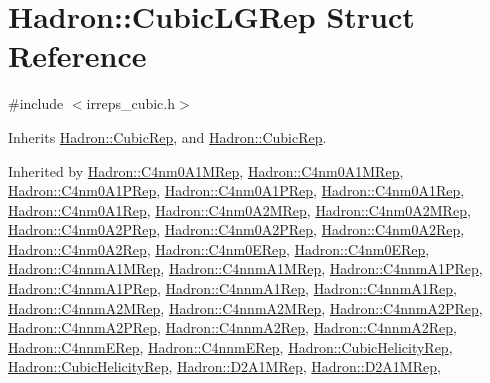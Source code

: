 \hypertarget{structHadron_1_1CubicLGRep}{}\section{Hadron\+:\+:Cubic\+L\+G\+Rep Struct Reference}
\label{structHadron_1_1CubicLGRep}


{\ttfamily \#include $<$irreps\+\_\+cubic.\+h$>$}



Inherits \mbox{\hyperlink{structHadron_1_1CubicRep}{Hadron\+::\+Cubic\+Rep}}, and \mbox{\hyperlink{structHadron_1_1CubicRep}{Hadron\+::\+Cubic\+Rep}}.



Inherited by \mbox{\hyperlink{structHadron_1_1C4nm0A1MRep}{Hadron\+::\+C4nm0\+A1\+M\+Rep}}, \mbox{\hyperlink{structHadron_1_1C4nm0A1MRep}{Hadron\+::\+C4nm0\+A1\+M\+Rep}}, \mbox{\hyperlink{structHadron_1_1C4nm0A1PRep}{Hadron\+::\+C4nm0\+A1\+P\+Rep}}, \mbox{\hyperlink{structHadron_1_1C4nm0A1PRep}{Hadron\+::\+C4nm0\+A1\+P\+Rep}}, \mbox{\hyperlink{structHadron_1_1C4nm0A1Rep}{Hadron\+::\+C4nm0\+A1\+Rep}}, \mbox{\hyperlink{structHadron_1_1C4nm0A1Rep}{Hadron\+::\+C4nm0\+A1\+Rep}}, \mbox{\hyperlink{structHadron_1_1C4nm0A2MRep}{Hadron\+::\+C4nm0\+A2\+M\+Rep}}, \mbox{\hyperlink{structHadron_1_1C4nm0A2MRep}{Hadron\+::\+C4nm0\+A2\+M\+Rep}}, \mbox{\hyperlink{structHadron_1_1C4nm0A2PRep}{Hadron\+::\+C4nm0\+A2\+P\+Rep}}, \mbox{\hyperlink{structHadron_1_1C4nm0A2PRep}{Hadron\+::\+C4nm0\+A2\+P\+Rep}}, \mbox{\hyperlink{structHadron_1_1C4nm0A2Rep}{Hadron\+::\+C4nm0\+A2\+Rep}}, \mbox{\hyperlink{structHadron_1_1C4nm0A2Rep}{Hadron\+::\+C4nm0\+A2\+Rep}}, \mbox{\hyperlink{structHadron_1_1C4nm0ERep}{Hadron\+::\+C4nm0\+E\+Rep}}, \mbox{\hyperlink{structHadron_1_1C4nm0ERep}{Hadron\+::\+C4nm0\+E\+Rep}}, \mbox{\hyperlink{structHadron_1_1C4nnmA1MRep}{Hadron\+::\+C4nnm\+A1\+M\+Rep}}, \mbox{\hyperlink{structHadron_1_1C4nnmA1MRep}{Hadron\+::\+C4nnm\+A1\+M\+Rep}}, \mbox{\hyperlink{structHadron_1_1C4nnmA1PRep}{Hadron\+::\+C4nnm\+A1\+P\+Rep}}, \mbox{\hyperlink{structHadron_1_1C4nnmA1PRep}{Hadron\+::\+C4nnm\+A1\+P\+Rep}}, \mbox{\hyperlink{structHadron_1_1C4nnmA1Rep}{Hadron\+::\+C4nnm\+A1\+Rep}}, \mbox{\hyperlink{structHadron_1_1C4nnmA1Rep}{Hadron\+::\+C4nnm\+A1\+Rep}}, \mbox{\hyperlink{structHadron_1_1C4nnmA2MRep}{Hadron\+::\+C4nnm\+A2\+M\+Rep}}, \mbox{\hyperlink{structHadron_1_1C4nnmA2MRep}{Hadron\+::\+C4nnm\+A2\+M\+Rep}}, \mbox{\hyperlink{structHadron_1_1C4nnmA2PRep}{Hadron\+::\+C4nnm\+A2\+P\+Rep}}, \mbox{\hyperlink{structHadron_1_1C4nnmA2PRep}{Hadron\+::\+C4nnm\+A2\+P\+Rep}}, \mbox{\hyperlink{structHadron_1_1C4nnmA2Rep}{Hadron\+::\+C4nnm\+A2\+Rep}}, \mbox{\hyperlink{structHadron_1_1C4nnmA2Rep}{Hadron\+::\+C4nnm\+A2\+Rep}}, \mbox{\hyperlink{structHadron_1_1C4nnmERep}{Hadron\+::\+C4nnm\+E\+Rep}}, \mbox{\hyperlink{structHadron_1_1C4nnmERep}{Hadron\+::\+C4nnm\+E\+Rep}}, \mbox{\hyperlink{structHadron_1_1CubicHelicityRep}{Hadron\+::\+Cubic\+Helicity\+Rep}}, \mbox{\hyperlink{structHadron_1_1CubicHelicityRep}{Hadron\+::\+Cubic\+Helicity\+Rep}}, \mbox{\hyperlink{structHadron_1_1D2A1MRep}{Hadron\+::\+D2\+A1\+M\+Rep}}, \mbox{\hyperlink{structHadron_1_1D2A1MRep}{Hadron\+::\+D2\+A1\+M\+Rep}}, 